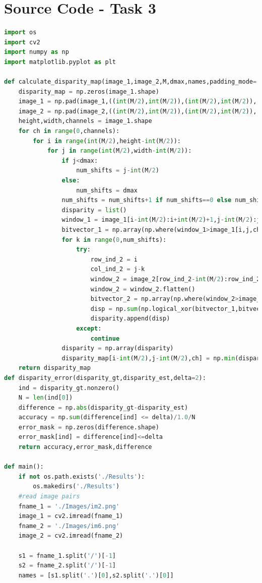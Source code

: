 \documentclass{article}
\begin{document}
\newpage
\section{Source Code - Task 3}
\begin{lstlisting}[language=Python]
import os
import cv2
import numpy as np
import matplotlib.pyplot as plt

def calculate_disparity_map(image_1,image_2,M,dmax,names,padding_mode='constant'):
	disparity_map = np.zeros(image_1.shape)
	image_1 = np.pad(image_1,((int(M/2),int(M/2)),(int(M/2),int(M/2)), (0,0)),mode=padding_mode)
	image_2 = np.pad(image_2,((int(M/2),int(M/2)),(int(M/2),int(M/2)), (0,0)),mode=padding_mode)
	height,width,channels = image_1.shape
	for ch in range(0,channels):
		for i in range(int(M/2),height-int(M/2)):
			for j in range(int(M/2),width-int(M/2)):
				if j<dmax:
					num_shifts = j-int(M/2)
				else:
					num_shifts = dmax
				num_shifts = num_shifts+1 if num_shifts==0 else num_shifts
				disparity = list()
				window_1 = image_1[i-int(M/2):i+int(M/2)+1,j-int(M/2):j+int(M/2)+1,ch].flatten()
				bitvector_1 = np.array(np.where(window_1>image_1[i,j,ch], 1, 0))
				for k in range(0,num_shifts):
					try:
						row_ind_2 = i
						col_ind_2 = j-k
						window_2 = image_2[row_ind_2-int(M/2):row_ind_2+int(M/2)+1,col_ind_2-int(M/2):col_ind_2+int(M/2)+1,ch]
						window_2 = window_2.flatten()
						bitvector_2 = np.array(np.where(window_2>image_2[row_ind_2,col_ind_2,ch], 1, 0))
						disp = np.sum(np.logical_xor(bitvector_1,bitvector_2).astype(int))
						disparity.append(disp)
					except:
						continue
				disparity = np.array(disparity)
				disparity_map[i-int(M/2),j-int(M/2),ch] = np.min(disparity)
	return disparity_map
def disparity_error(disparity_gt,disparity_est,delta=2):
	ind = disparity_gt.nonzero()
	N = len(ind[0])
	difference = np.abs(disparity_gt-disparity_est)
	accuracy = np.sum(difference[ind] <= delta)/1.0/N
	error_mask = np.zeros(difference.shape)
	error_mask[ind] = difference[ind]<=delta
	return accuracy,error_mask,difference

def main():
	if not os.path.exists('./Results'):
		os.makedirs('./Results')
	#read image pairs
	fname_1 = './Images/im2.png'
	image_1 = cv2.imread(fname_1)
	fname_2 = './Images/im6.png'
	image_2 = cv2.imread(fname_2)

	s1 = fname_1.split('/')[-1]
	s2 = fname_2.split('/')[-1]
	names = [s1.split('.')[0],s2.split('.')[0]]


\end{lstlisting}
\end{document}
